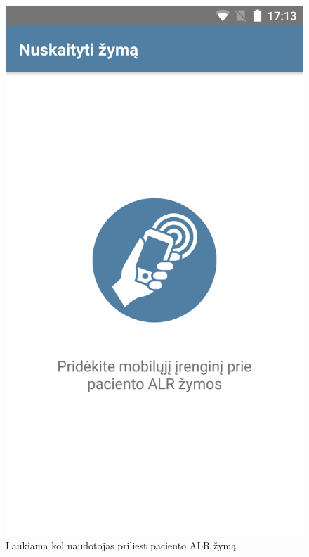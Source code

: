 \documentclass{VUMIFPSbakalaurinis}
\begin{document}
\begin{figure}[H]
    \centering
    \includegraphics[scale=0.15]{images/prototype-3}
    \caption{Laukiama kol naudotojas priliest paciento ALR žymą} 
\end{figure}
\end{document}
